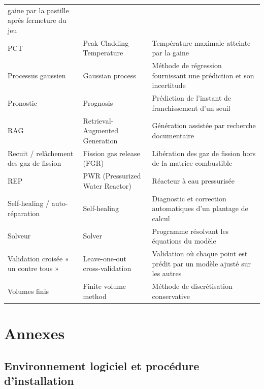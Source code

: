 \documentclass[12pt,a4paper,french]{report}
\begin{document}
\begin{xltabular}{\textwidth}{@{}>{\raggedright\arraybackslash}p{2.6cm}
                     >{\raggedright\arraybackslash}p{4.4cm}
                     >{\raggedright\arraybackslash}X@{}}
  gaine par la pastille après fermeture du jeu\\
PCT & Peak Cladding Temperature & Température maximale atteinte par la gaine\\
Processus gaussien & Gaussian process & Méthode de régression fournissant une
  prédiction et son incertitude\\
Pronostic & Prognosis & Prédiction de l'instant de franchissement d'un seuil\\
RAG & Retrieval-Augmented Generation & Génération assistée par recherche
  documentaire\\
Recuit / relâchement des gaz de fission & Fission gas release (FGR) &
  Libération des gaz de fission hors de la matrice combustible\\
REP & PWR (Pressurized Water Reactor) & Réacteur à eau pressurisée\\
Self-healing / auto-réparation & Self-healing & Diagnostic et correction
  automatiques d'un plantage de calcul\\
Solveur & Solver & Programme résolvant les équations du modèle\\
Validation croisée « un contre tous » & Leave-one-out cross-validation &
  Validation où chaque point est prédit par un modèle ajusté sur les autres\\
Volumes finis & Finite volume method & Méthode de discrétisation conservative\\
\bottomrule
\end{xltabular}

\clearpage

\appendix
\chapter*{Annexes}

\renewcommand{\thesection}{Annexe \Alph{section}}
\setcounter{section}{0}

\section{Environnement logiciel et procédure d'installation}
\label{ann:install}
\end{document}
